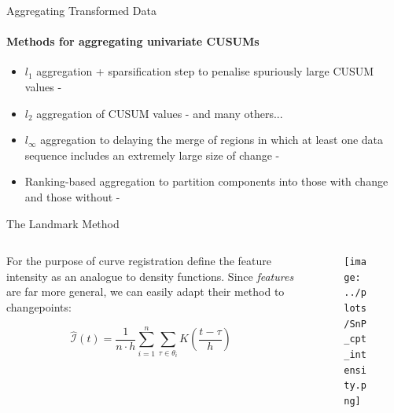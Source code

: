\documentclass{beamer}
\begin{document}

\begin{frame}{Aggregating Transformed Data}
\framesubtitle{Methods for aggregating univariate CUSUMs}
        
\begin{itemize}
    \item $l_1$ aggregation + sparsification step to penalise spuriously large CUSUM values - \cite{cho2015multiple}
    \item $l_2$ aggregation of CUSUM values - \cite{enikeeva2013high} and many others...
    \item $l_\infty$ aggregation to delaying the merge of regions in which at least one data sequence includes an extremely large size of change - \cite{maeng2019adaptive}
    \item Ranking-based aggregation to partition components into those with change and those without - \cite{cho2015multiple}
\end{itemize}
    
\end{frame}




\begin{frame}{The Landmark Method}


\begin{columns}

    \begin{column}{0.5\textwidth}
    For the purpose of curve registration \cite{kneip1992statistical} define the feature intensity as an analogue to density functions. Since \textit{features} are far more general, we can easily adapt their method to changepoints:  

\begin{equation*}
	\widehat{\mathcal{I}} \left ( t \right ) = \frac{1}{n\cdot h} \sum_{i=1}^n \sum_{\tau \in \theta_i} K \left ( \frac{t - \tau}{h} \right )
\end{equation*}
    \end{column}
    
    \begin{column}{0.5\textwidth}
    \begin{figure}
	\centering
	\texttt{[image: ../plots/SnP\_cpt\_intensity.png]}
\end{figure}

    \end{column}
    
    
\end{columns}

\end{frame}
\end{document}
